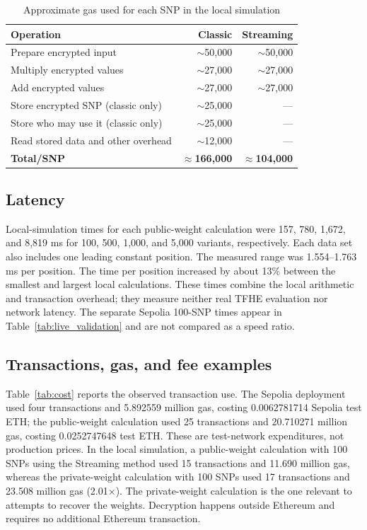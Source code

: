 \documentclass[10pt]{article}
\begin{document}
\begin{table}[ht]
\centering
\caption{Approximate gas used for each SNP in the local simulation}
\label{tab:persnp}
\small
\setlength{\tabcolsep}{4pt}
\begin{tabularx}{\columnwidth}{@{}Yrr@{}}
\toprule
\textbf{Operation} & \textbf{Classic} & \textbf{Streaming} \\
\midrule
Prepare encrypted input          & $\sim$50,000 & $\sim$50,000 \\
Multiply encrypted values        & $\sim$27,000 & $\sim$27,000 \\
Add encrypted values             & $\sim$27,000 & $\sim$27,000 \\
Store encrypted SNP (classic only) & $\sim$25,000 & --- \\
Store who may use it (classic only) & $\sim$25,000 & --- \\
Read stored data and other overhead & $\sim$12,000 & --- \\
\midrule
\textbf{Total/SNP}               & $\approx$\textbf{166,000} & $\approx$\textbf{104,000} \\
\bottomrule
\end{tabularx}
\end{table}

\subsection{Latency}

Local-simulation times for each public-weight calculation were 157, 780, 1,672, and
8,819 ms for 100, 500, 1,000, and 5,000 variants, respectively.  Each data set also
includes one leading constant position.  The measured range was 1.554--1.763 ms per
position.  The time per position increased by about 13\% between the smallest and
largest local calculations.  These times combine the local arithmetic and
transaction overhead; they measure neither real TFHE evaluation nor network latency.
The separate Sepolia 100-SNP times appear in Table~\ref{tab:live_validation}
and are not compared as a speed ratio.

\subsection{Transactions, gas, and fee examples}

Table~\ref{tab:cost} reports the observed transaction use.  The Sepolia deployment used
four transactions and 5.892559 million gas, costing 0.0062781714 Sepolia test ETH; the
public-weight calculation used 25 transactions and 20.710271
million gas, costing 0.0252747648 test ETH.  These are test-network expenditures, not
production prices.  In the local simulation, a public-weight calculation with 100 SNPs
using the Streaming method used 15 transactions and 11.690 million gas, whereas the
private-weight calculation with 100 SNPs used 17 transactions and 23.508 million gas
(2.01$\times$).  The private-weight calculation is the one relevant to attempts to
recover the weights.  Decryption happens outside Ethereum and requires no additional
Ethereum transaction.
\end{document}
